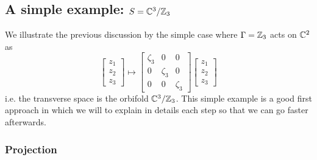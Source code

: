    \subsection{A simple example: $S=\mathbb{C}^3/\mathbb{Z}_3$}\label{sec:C3Z3}

        We illustrate the previous discussion by the simple case where $\Gamma=\mathbb{Z}_3$ acts on $\mathbb{C}^2$ as
        \begin{equation}
            \begin{bmatrix}
                z_1\\z_2\\z_3
            \end{bmatrix}\mapsto
            \begin{bmatrix}
                \zeta_3 & 0 & 0 \\
                0 & \zeta_3 & 0 \\
                0 & 0 & \zeta_3
            \end{bmatrix}
            \begin{bmatrix}
                z_1\\z_2\\z_3
            \end{bmatrix}
        \end{equation}
        i.e. the transverse space is the orbifold $\mathbb{C}^3/\mathbb{Z}_3$. This simple example is a good first approach in which we will to explain in details each step so that we can go faster afterwards.

        \subsubsection{Projection}

